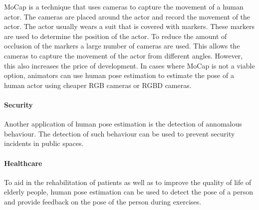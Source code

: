 MoCap is a technique that uses cameras to capture the movement of a human actor. The cameras are placed around the actor and record the movement of the actor. The actor usually wears a suit that is covered with markers. These markers are used to determine the position of the actor. To reduce the amount of occlusion of the markers a large number of cameras are used. This allows the cameras to capture the movement of the actor from different angles. However, this also increases the price of development. In cases where MoCap is not a viable option, animators can use human pose estimation to estimate the pose of a human actor using cheaper RGB cameras or RGBD cameras.

\paragraph{Security}

Another application of human pose estimation is the detection of annomalous behaviour. The detection of such behaviour can be used to prevent security incidents in public spaces.

\paragraph{Healthcare}

To aid in the rehabilitation of patients as well as to improve the quality of life of elderly people, human pose estimation can be used to detect the pose of a person and provide feedback on the pose of the person during exercises.\cite{ClinicalApplicationChen}





